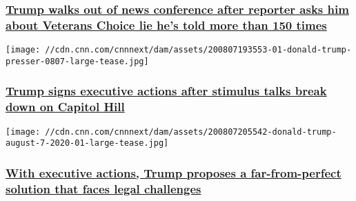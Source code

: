 \hypertarget{trump-walks-out-of-news-conference-after-reporter-asks-him-about-veterans-choice-lie-hes-told-more-than-150-times-}{%
\subsubsection{\texorpdfstring{\href{/2020/08/08/politics/trump-veterans-choice-paula-reid/index.html}{Trump
walks out of news conference after reporter asks him about Veterans
Choice lie he's told more than 150 times
}}{Trump walks out of news conference after reporter asks him about Veterans Choice lie he's told more than 150 times }}\label{trump-walks-out-of-news-conference-after-reporter-asks-him-about-veterans-choice-lie-hes-told-more-than-150-times-}}

\href{/2020/08/08/politics/trump-executive-order-stimulus/index.html}{}

\texttt{[image: //cdn.cnn.com/cnnnext/dam/assets/200807193553-01-donald-trump-presser-0807-large-tease.jpg]}

\hypertarget{trump-signs-executive-actions-after-stimulus-talks-break-down-on-capitol-hill-}{%
\subsubsection{\texorpdfstring{\href{/2020/08/08/politics/trump-executive-order-stimulus/index.html}{Trump
signs executive actions after stimulus talks break down on Capitol Hill
}}{Trump signs executive actions after stimulus talks break down on Capitol Hill }}\label{trump-signs-executive-actions-after-stimulus-talks-break-down-on-capitol-hill-}}

\href{/2020/08/08/politics/trump-democrats-stimulus-talks-stalled/index.html}{}

\texttt{[image: //cdn.cnn.com/cnnnext/dam/assets/200807205542-donald-trump-august-7-2020-01-large-tease.jpg]}

\hypertarget{with-executive-actions-trump-proposes-a-far-from-perfect-solution-that-faces-legal-challenges}{%
\subsubsection{\texorpdfstring{\href{/2020/08/08/politics/trump-democrats-stimulus-talks-stalled/index.html}{With
executive actions, Trump proposes a far-from-perfect solution that faces
legal
challenges}}{With executive actions, Trump proposes a far-from-perfect solution that faces legal challenges}}\label{with-executive-actions-trump-proposes-a-far-from-perfect-solution-that-faces-legal-challenges}}

